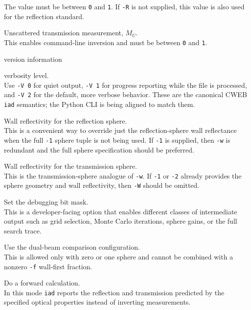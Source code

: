 \documentclass{article}
\begin{document}
\begin{description}
                 The value must be between \texttt{0} and \texttt{1}.  If \texttt{-R} is not supplied,
                 this value is also used for the reflection standard.
    \item[-u \#] Unscattered transmission measurement, $M_U$.\\[1mm]
                 This enables command-line inversion and must be between \texttt{0} and \texttt{1}.
    \item[-v] version information
    \item[-V 0 | 1 | 2] verbosity level.\\[1mm]
                 Use \texttt{-V 0} for quiet output, \texttt{-V 1} for progress
                 reporting while the file is processed, and \texttt{-V 2} for the
                 default, more verbose behavior.  These are the canonical CWEB
                 \texttt{iad} semantics; the Python CLI is being aligned to match them.
    \item[-w \#] Wall reflectivity for the reflection sphere.\\[1mm]
                 This is a convenient way to override just the reflection-sphere
                 wall reflectance when the full \texttt{-1} sphere tuple is not
                 being used.  If \texttt{-1} is supplied, then \texttt{-w} is
                 redundant and the full sphere specification should be preferred.
    \item[-W \#] Wall reflectivity for the transmission sphere.\\[1mm]
                 This is the transmission-sphere analogue of \texttt{-w}.  If
                 \texttt{-1} or \texttt{-2} already provides the sphere geometry
                 and wall reflectivity, then \texttt{-W} should be omitted.
    \item[-x \#] Set the debugging bit mask.\\[1mm]
                 This is a developer-facing option that enables different classes
                 of intermediate output such as grid selection, Monte Carlo
                 iterations, sphere gains, or the full search trace.
    \item[-X] Use the dual-beam comparison configuration.\\[1mm]
                 This is allowed only with zero or one sphere and cannot be combined with a nonzero
                 \texttt{-f} wall-first fraction.
    \item[-z] Do a forward calculation.\\[1mm]
                 In this mode \texttt{iad} reports the reflection and transmission predicted by the
                 specified optical properties instead of inverting measurements.
\end{description}
\end{document}
